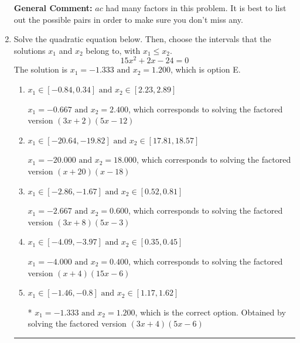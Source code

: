 \documentclass{extbook}[14pt]
\newcommand{\litem}[1]{\item #1

\rule{\textwidth}{0.4pt}}
\begin{document}
\begin{enumerate}
{\textbf{General Comment:} $ac$ had many factors in this problem. It is best to list out the possible pairs in order to make sure you don't miss any.
}
\litem{
Solve the quadratic equation below. Then, choose the intervals that the solutions $x_1$ and $x_2$ belong to, with $x_1 \leq x_2$.
\[ 15x^{2} +2 x -24 = 0 \]The solution is \( x_1 = -1.333 \text{ and } x_2 = 1.200 \), which is option E.\begin{enumerate}[label=\Alph*.]
\item \( x_1 \in [-0.84, 0.34] \text{ and } x_2 \in [2.23, 2.89] \)

$x_1 = -0.667 \text{ and } x_2 = 2.400$, which corresponds to solving the factored version $(3x + 2)(5x -12)$
\item \( x_1 \in [-20.64, -19.82] \text{ and } x_2 \in [17.81, 18.57] \)

$x_1 = -20.000 \text{ and } x_2 = 18.000$, which corresponds to solving the factored version $(x + 20)(x -18)$
\item \( x_1 \in [-2.86, -1.67] \text{ and } x_2 \in [0.52, 0.81] \)

$x_1 = -2.667 \text{ and } x_2 = 0.600$, which corresponds to solving the factored version $(3x + 8)(5x -3)$
\item \( x_1 \in [-4.09, -3.97] \text{ and } x_2 \in [0.35, 0.45] \)

$x_1 = -4.000 \text{ and } x_2 = 0.400$, which corresponds to solving the factored version $(x + 4)(15x -6)$
\item \( x_1 \in [-1.46, -0.8] \text{ and } x_2 \in [1.17, 1.62] \)

* $x_1 = -1.333 \text{ and } x_2 = 1.200$, which is the correct option. Obtained by solving the factored version $(3x + 4)(5x -6)$
\end{enumerate}

}
\end{enumerate}
\end{document}
